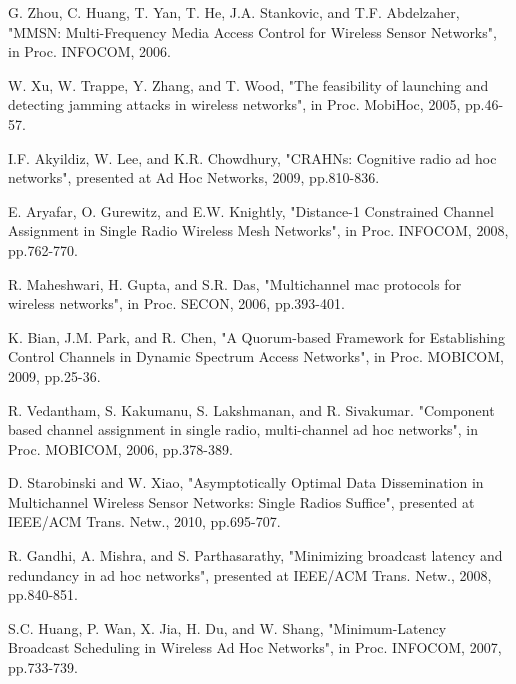 \documentclass[10pt, conference]{IEEEtran}
\begin{document}
\begin{thebibliography}{1}


G. Zhou, C. Huang, T. Yan, T. He, J.A. Stankovic,  and T.F. Abdelzaher,  "MMSN: Multi-Frequency Media Access Control for Wireless Sensor Networks",  in Proc. INFOCOM, 2006.



W. Xu, W. Trappe, Y. Zhang,  and T. Wood,  "The feasibility of launching and detecting jamming attacks in wireless networks",  in Proc. MobiHoc, 2005, pp.46-57.

I.F. Akyildiz, W. Lee,  and K.R. Chowdhury,  "CRAHNs: Cognitive radio ad hoc networks",  presented at Ad Hoc Networks, 2009, pp.810-836.



E. Aryafar, O. Gurewitz,  and E.W. Knightly,  "Distance-1 Constrained Channel Assignment in Single Radio Wireless Mesh Networks",  in Proc. INFOCOM, 2008, pp.762-770.

R. Maheshwari, H. Gupta, and S.R. Das, "Multichannel mac protocols for wireless 	
networks", in Proc. SECON, 2006, pp.393-401.






K. Bian, J.M. Park,  and R. Chen,  "A Quorum-based Framework for Establishing Control Channels in Dynamic Spectrum Access Networks",  in Proc. MOBICOM, 2009, pp.25-36.

R. Vedantham, S. Kakumanu, S. Lakshmanan,  and R. Sivakumar.
"Component based channel assignment in single radio, multi-channel ad hoc networks",  in Proc. MOBICOM, 2006, pp.378-389.



D. Starobinski and W. Xiao,  "Asymptotically Optimal Data Dissemination in Multichannel Wireless Sensor Networks: Single Radios Suffice",  presented at IEEE/ACM Trans. Netw., 2010, pp.695-707.





R. Gandhi, A. Mishra,  and S. Parthasarathy,  "Minimizing broadcast latency and redundancy in ad hoc networks",  presented at IEEE/ACM Trans. Netw., 2008, pp.840-851.

S.C. Huang, P. Wan, X. Jia, H. Du,  and W. Shang,  "Minimum-Latency Broadcast Scheduling in Wireless Ad Hoc Networks",  in Proc. INFOCOM, 2007, pp.733-739.


\end{thebibliography}
\end{document}
